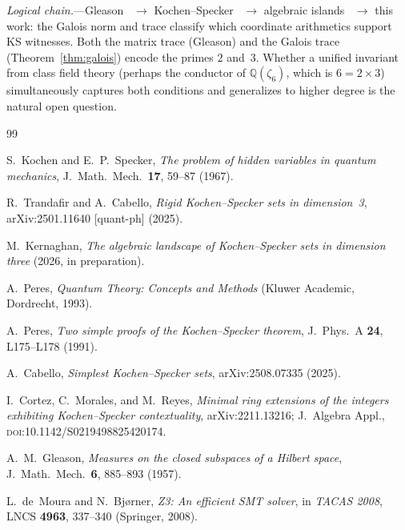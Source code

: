 \documentclass[12pt,a4paper]{article}
\newcommand{\Q}{\mathbb{Q}}
\begin{document}
\textit{Logical chain.}---Gleason~\cite{Gleason1957} $\to$
Kochen--Specker~\cite{KochenSpecker1967} $\to$
algebraic islands~\cite{Kernaghan2026islands} $\to$ this work: the
Galois norm and trace classify which coordinate arithmetics support
KS witnesses.  Both the matrix trace (Gleason) and the Galois trace
(Theorem~\ref{thm:galois}) encode the primes $2$ and~$3$.  Whether a
unified invariant from class field theory (perhaps the conductor of
$\Q(\zeta_6)$, which is $6 = 2 \times 3$) simultaneously captures
both conditions and generalizes to higher degree is the natural open
question.

\begin{thebibliography}{99}

S.~Kochen and E.~P.~Specker,
\textit{The problem of hidden variables in quantum mechanics},
J.~Math.\ Mech.\ \textbf{17}, 59--87 (1967).

R.~Trandafir and A.~Cabello,
\textit{Rigid Kochen--Specker sets in dimension~3},
arXiv:2501.11640 [quant-ph] (2025).

M.~Kernaghan,
\textit{The algebraic landscape of Kochen--Specker sets in dimension
three} (2026, in preparation).

A.~Peres,
\textit{Quantum Theory: Concepts and Methods}
(Kluwer Academic, Dordrecht, 1993).

A.~Peres,
\textit{Two simple proofs of the Kochen--Specker theorem},
J.~Phys.~A \textbf{24}, L175--L178 (1991).

A.~Cabello,
\textit{Simplest Kochen--Specker sets},
arXiv:2508.07335 (2025).

I.~Cortez, C.~Morales, and M.~Reyes,
\textit{Minimal ring extensions of the integers exhibiting Kochen--Specker contextuality},
arXiv:2211.13216; J.\ Algebra Appl., \textsc{doi}:10.1142/S0219498825420174.

A.~M.~Gleason,
\textit{Measures on the closed subspaces of a Hilbert space},
J.~Math.\ Mech.\ \textbf{6}, 885--893 (1957).

L.~de~Moura and N.~Bj{\o}rner,
\textit{Z3: An efficient SMT solver},
in \textit{TACAS 2008}, LNCS \textbf{4963}, 337--340 (Springer, 2008).

\end{thebibliography}
\end{document}
